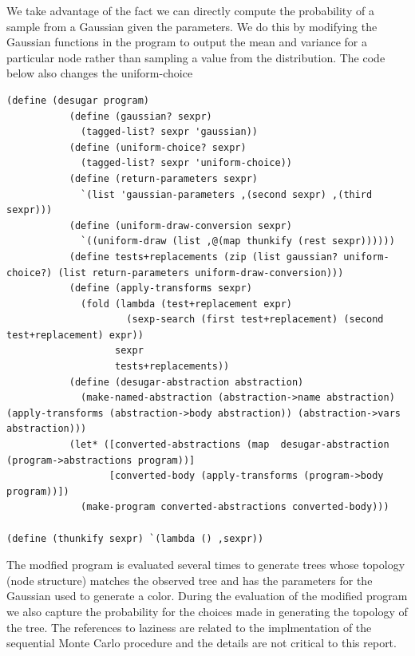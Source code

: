 \documentclass[a4paper,10pt]{article}
\begin{document}
We take advantage of the fact we can directly compute the probability of a sample from a Gaussian given the parameters.  We do this by modifying the Gaussian functions in the program to output the mean and variance for a particular node rather than sampling a value from the distribution.  The code below also changes the uniform-choice 
\begin{lstlisting}[frame=trBL]
(define (desugar program)
           (define (gaussian? sexpr)
             (tagged-list? sexpr 'gaussian))
           (define (uniform-choice? sexpr)
             (tagged-list? sexpr 'uniform-choice))
           (define (return-parameters sexpr)
             `(list 'gaussian-parameters ,(second sexpr) ,(third sexpr)))
           (define (uniform-draw-conversion sexpr)
             `((uniform-draw (list ,@(map thunkify (rest sexpr))))))
           (define tests+replacements (zip (list gaussian? uniform-choice?) (list return-parameters uniform-draw-conversion)))
           (define (apply-transforms sexpr)
             (fold (lambda (test+replacement expr)
                     (sexp-search (first test+replacement) (second test+replacement) expr))
                   sexpr
                   tests+replacements))
           (define (desugar-abstraction abstraction)
             (make-named-abstraction (abstraction->name abstraction) (apply-transforms (abstraction->body abstraction)) (abstraction->vars abstraction)))
           (let* ([converted-abstractions (map  desugar-abstraction (program->abstractions program))]
                  [converted-body (apply-transforms (program->body program))])
             (make-program converted-abstractions converted-body)))

(define (thunkify sexpr) `(lambda () ,sexpr))
\end{lstlisting}
The modfied program is evaluated several times to generate trees whose topology (node structure) matches the observed tree and has the parameters for the Gaussian used to generate a color.  During the evaluation of the modified program we also capture the probability for the choices made in generating the topology of the tree.  The references to laziness are related to the implmentation of the sequential Monte Carlo procedure and the details are not critical to this report.
\end{document}
